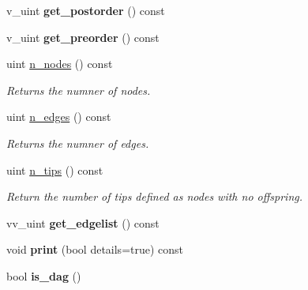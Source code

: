 \begin{DoxyCompactItemize}
\item 
v\+\_\+uint {\bfseries get\+\_\+postorder} () const \hypertarget{classTree_a333503b86f195c8e84248a59eefe2fdf}{}\label{classTree_a333503b86f195c8e84248a59eefe2fdf}

\item 
v\+\_\+uint {\bfseries get\+\_\+preorder} () const \hypertarget{classTree_a22f81a8b7062b224f13dd1f2e7a1f7e0}{}\label{classTree_a22f81a8b7062b224f13dd1f2e7a1f7e0}

\item 
uint \hyperlink{classTree_a69612e5a3a479c16d12b661e6bac4062}{n\+\_\+nodes} () const \hypertarget{classTree_a69612e5a3a479c16d12b661e6bac4062}{}\label{classTree_a69612e5a3a479c16d12b661e6bac4062}

\begin{DoxyCompactList}\small\item\em Returns the numner of nodes. \end{DoxyCompactList}\item 
uint \hyperlink{classTree_a055847ae7ad6387a32113a1fe24ca61b}{n\+\_\+edges} () const \hypertarget{classTree_a055847ae7ad6387a32113a1fe24ca61b}{}\label{classTree_a055847ae7ad6387a32113a1fe24ca61b}

\begin{DoxyCompactList}\small\item\em Returns the numner of edges. \end{DoxyCompactList}\item 
uint \hyperlink{classTree_a0fd92859e0d3e125de6ae4b4af0e301a}{n\+\_\+tips} () const \hypertarget{classTree_a0fd92859e0d3e125de6ae4b4af0e301a}{}\label{classTree_a0fd92859e0d3e125de6ae4b4af0e301a}

\begin{DoxyCompactList}\small\item\em Return the number of tips defined as nodes with no offspring. \end{DoxyCompactList}\item 
vv\+\_\+uint {\bfseries get\+\_\+edgelist} () const \hypertarget{classTree_a700fd8abdcb805f53999b2fb00fc2710}{}\label{classTree_a700fd8abdcb805f53999b2fb00fc2710}

\item 
void {\bfseries print} (bool details=true) const \hypertarget{classTree_afe757ac173ac177a0ebefd222a06eed5}{}\label{classTree_afe757ac173ac177a0ebefd222a06eed5}

\item 
bool {\bfseries is\+\_\+dag} ()\hypertarget{classTree_af793b391043a88ceea805b584efb982a}{}\label{classTree_af793b391043a88ceea805b584efb982a}


\end{DoxyCompactItemize}
